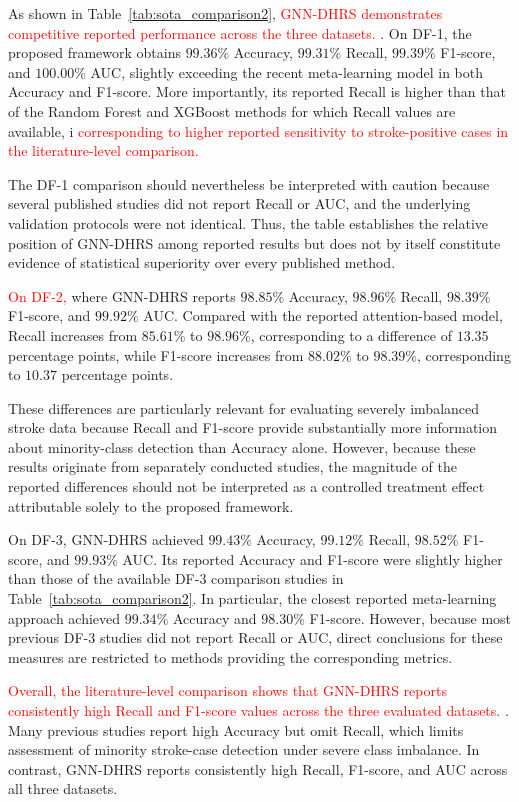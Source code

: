 \documentclass[pdflatex,sn-mathphys-num]{sn-jnl}%
\theoremstyle{thmstyleone}%
\theoremstyle{thmstyletwo}%
\theoremstyle{thmstylethree}%
\begin{document}
As shown in Table~\ref{tab:sota_comparison2}, \textcolor{red}{
GNN-DHRS demonstrates competitive reported performance across the three
datasets.
}. On DF-1, the
proposed framework obtains \(99.36\%\) Accuracy, \(99.31\%\) Recall,
\(99.39\%\) F1-score, and \(100.00\%\) AUC, slightly exceeding the recent
meta-learning model in both Accuracy and F1-score. More importantly, its
reported Recall is  higher than that of the Random Forest and
XGBoost methods for which Recall values are available, i\textcolor{red}{
corresponding to higher reported sensitivity to stroke-positive cases in the
literature-level comparison.
}

{
The DF-1 comparison should nevertheless be interpreted with caution because
several published studies did not report Recall or AUC, and the underlying
validation protocols were not identical. Thus, the table establishes the
relative position of GNN-DHRS among reported results but does not by itself
constitute evidence of statistical superiority over every published method.
}

\textcolor{red}{
On DF-2,
} where GNN-DHRS reports
\(98.85\%\) Accuracy, \(98.96\%\) Recall, \(98.39\%\) F1-score, and
\(99.92\%\) AUC. Compared with the reported attention-based model, Recall
increases from \(85.61\%\) to \(98.96\%\), corresponding to a difference of
\(13.35\) percentage points, while F1-score increases from \(88.02\%\) to
\(98.39\%\), corresponding to \(10.37\) percentage points.

 {
These differences are particularly relevant for evaluating severely
imbalanced stroke data because Recall and F1-score provide substantially more
information about minority-class detection than Accuracy alone. However,
because these results originate from separately conducted studies, the
magnitude of the reported differences should not be interpreted as a
controlled treatment effect attributable solely to the proposed framework.
}

 {
On DF-3, GNN-DHRS achieved \(99.43\%\) Accuracy, \(99.12\%\) Recall,
\(98.52\%\) F1-score, and \(99.93\%\) AUC. Its reported Accuracy and
F1-score were slightly higher than those of the available DF-3 comparison
studies in Table~\ref{tab:sota_comparison2}. In particular, the closest
reported meta-learning approach achieved \(99.34\%\) Accuracy and
\(98.30\%\) F1-score. However, because most previous DF-3 studies did not
report Recall or AUC, direct conclusions for these measures are restricted to
methods providing the corresponding metrics.
}

\textcolor{red}{
Overall, the literature-level comparison shows that GNN-DHRS reports
consistently high Recall and F1-score values across the three evaluated
datasets.
}. Many
previous studies report high Accuracy but omit Recall, which limits assessment
of minority stroke-case detection under severe class imbalance. In contrast,
GNN-DHRS reports consistently high Recall, F1-score, and AUC across all three
datasets.
\end{document}
